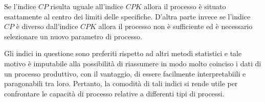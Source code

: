 Se l'indice $CP$ risulta uguale all'indice $CPK$ allora il processo è situato esattamente al centro dei limiti delle specifiche.
D'altra parte invece se l'indice $CP$ è diverso dall'indice $CPK$ allora il processo non è sufficiente ed è necessario selezionare un nuovo parametro di processo. 
\cite{yunus2016preliminary}


Gli indici in questione sono preferiti rispetto ad altri metodi statistici e tale motivo è imputabile alla possibilità di riassumere in modo molto coinciso i dati di un processo produttivo, con il vantaggio, di essere facilmente interpretabiili e paragonabili tra loro.
Pertanto, la comodità di tali indici si rende utile per confrontare le capacità di processo relative a differenti tipi di processi. 
\cite{Meetheskilles}

